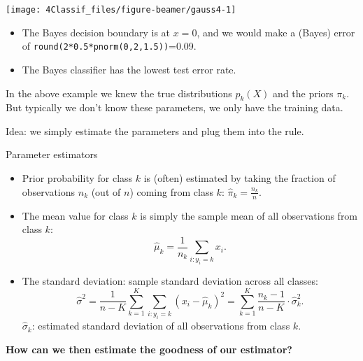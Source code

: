 \documentclass[10pt,ignorenonframetext,]{beamer}
\begin{document}
\begin{frame}[fragile]

\begin{center}\texttt{[image: 4Classif\_files/figure-beamer/gauss4-1]} \end{center}

\begin{itemize}
\item
  The Bayes decision boundary is at \(x=0\), and we would make a (Bayes)
  error of \texttt{round(2*0.5*pnorm(0,2,1.5))}=0.09.
\item
  The Bayes classifier has the lowest test error rate.
\end{itemize}

\end{frame}

\begin{frame}

\vspace{2mm}

In the above example we knew the true distributions \(p_k(X)\) and the
priors \(\pi_k\). But typically we don't know these parameters, we only
have the training data.

Idea: we simply estimate the parameters and plug them into the rule.

\end{frame}

\begin{frame}

\begin{block}{Parameter estimators}

\vspace{2mm}

\begin{itemize}
\item
  Prior probability for class \(k\) is (often) estimated by taking the
  fraction of observations \(n_k\) (out of \(n\)) coming from class
  \(k\): \(\hat{\pi}_k = \frac{n_k}{n}.\)
\item
  The mean value for class \(k\) is simply the sample mean of all
  observations from class \(k\):
  \[\hat{\mu}_k = \frac{1}{n_k}\sum_{i:y_i=k} x_i.\]
\item
  The standard deviation: sample standard deviation across all classes:
  \[\hat{\sigma}^2=\frac{1}{n-K}\sum_{k=1}^K \sum_{i: y_i=k} (x_i-\hat{\mu}_k)^2 = \sum_{k=1}^K \frac{n_k - 1}{n - K} \cdot \hat{\sigma}_k^2.\]
  \(\hat{\sigma}_k\): estimated standard deviation of all observations
  from class \(k\).
\end{itemize}

\textbf{How can we then estimate the goodness of our estimator?}

\end{block}

\end{frame}
\end{document}
